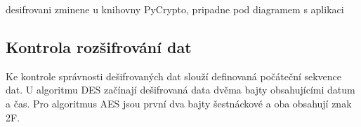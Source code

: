  \colorbox[rgb]{1,0,0}{desifrovani zminene u knihovny PyCrypto, pripadne pod diagramem s aplikaci}


\subsection{Kontrola rozšifrování dat}
Ke kontrole správnosti dešifrovaných dat slouží definovaná počáteční sekvence dat. U algoritmu DES začínají dešifrovaná data dvěma bajty obsahujícími datum a čas. Pro algoritmus AES jsou první dva bajty šestnáckové a oba obsahují znak 2F.



















